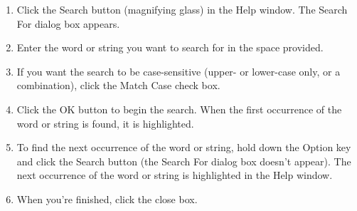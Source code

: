 \begin{enumerate}
\item Click the Search button (magnifying glass) in the Help window. The Search For
dialog box appears. 
\item Enter the word or string you want to search for in the space provided. 
\item If you want the search to be case-sensitive (upper- or lower-case only, or a
combination), click the Match Case check box. 
\item Click the OK button to begin the search. When the first occurrence of the word
or string is found, it is highlighted. 
\item To find the next occurrence of the word or string, hold down the Option key
and click the Search button (the Search For dialog box doesn't appear). The
next occurrence of the word or string is highlighted in the Help window. 
\item When you're finished, click the close box.
\end{enumerate}
